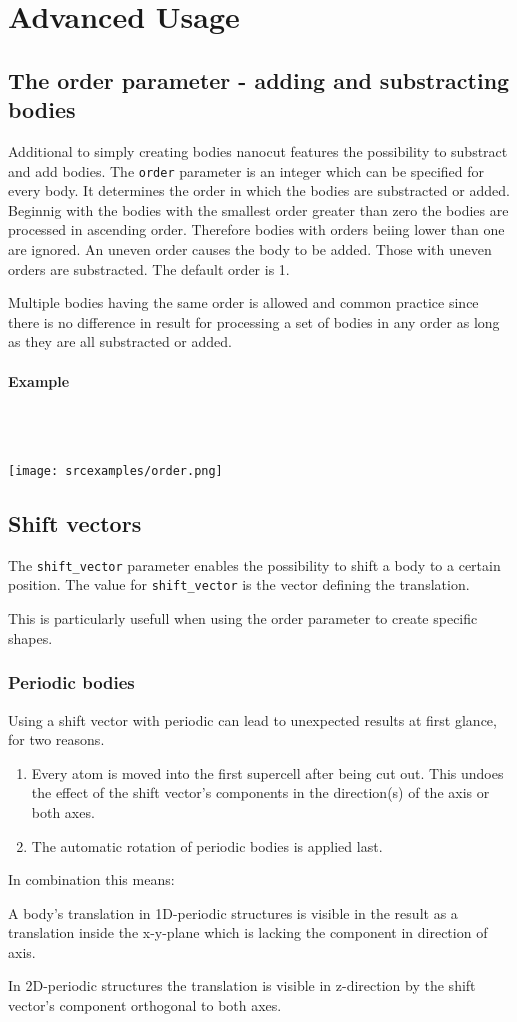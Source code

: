 \section{Advanced Usage}
\subsection{The order parameter - adding and substracting bodies}
Additional to simply creating bodies nanocut features the possibility to substract and add bodies.
The \lstinline{order} parameter is an integer which can be specified for every body. It determines the order in which the bodies are substracted or added. Beginnig with the bodies with the smallest order greater than zero the bodies are processed in ascending order. Therefore bodies with orders beiing lower than one are ignored.
An uneven order causes the body to be added. Those with uneven orders are substracted. The default order is 1.

Multiple bodies having the same order is allowed and common practice since there is no difference in result for processing a set of bodies in any order as long as they are all substracted or added.

\paragraph{Example}\ 

\ \\\texttt{[image: srcexamples/order.png]}

\subsection{Shift vectors}
The \lstinline{shift_vector} parameter enables the possibility to shift a body to a certain position. The value for \lstinline{shift_vector} is the vector defining the translation.

This is particularly usefull when using the order parameter to create specific shapes.

\subsubsection{Periodic bodies}

Using a shift vector with periodic can lead to unexpected results at first glance, for two reasons. 
\begin{enumerate}
 \item Every atom is moved into the first supercell after being cut out. This undoes the effect of the shift vector's components in the direction(s) of the axis or both axes.
 \item The automatic rotation of periodic bodies is applied last.
\end{enumerate}
In combination this means: 

A body's translation in 1D-periodic structures is visible in the result as a translation inside the x-y-plane which is lacking the component in direction of axis.

In 2D-periodic structures the translation is visible in z-direction by the shift vector's component orthogonal to both axes.

